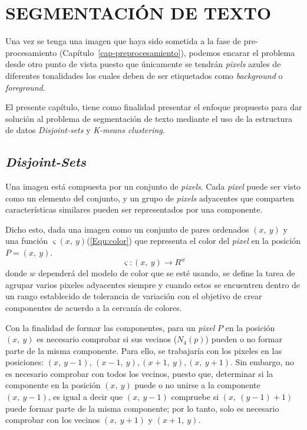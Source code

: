 \chapter{SEGMENTACIÓN DE TEXTO}
\label{cap-segmentacion}

\setcounter{secnumdepth}{0}

Una vez se tenga una imagen que haya sido sometida a la fase de pre-
procesamiento (Capítulo~\ref{cap-preprocesamiento}), podemos encarar el problema
 desde otro punto de vista puesto que únicamente se tendrán \textit{pixels} 
 azules de diferentes tonalidades los cuales deben de ser etiquetados como 
 \textit{background} o \textit{foreground}.

El presente capítulo, tiene como finalidad presentar el enfoque propuesto para 
dar solución al problema de segmentación de texto mediante el uso de la 
estructura de datos \textit{Disjoint-sets} y \textit{K-means clustering}.

\setcounter{secnumdepth}{3}
\section{\textit{Disjoint-Sets}}
Una imagen está compuesta por un conjunto de \textit{pixels}. Cada 
\textit{pixel} puede ser visto como un elemento del conjunto, y un grupo de 
\textit{pixels} adyacentes que comparten características similares pueden ser
 representados por una componente.

Dicho esto, dada una imagen como un conjunto de pares ordenados $(x,~y)$ y una 
función $\varsigma(x,~y)$(\ref{Equ:color}) que representa el color del 
\textit{pixel} en la posición $P=(x,~y)$.
\begin{equation}
	\varsigma:(x,~y) \rightarrow R^w
	\label{Equ:color}
\end{equation}
donde $w$ dependerá del modelo de color que se esté usando, se define la tarea
 de agrupar varios pixeles adyacentes siempre y cuando estos se encuentren 
 dentro de un rango establecido de tolerancia de variación con el objetivo de 
 crear componentes de acuerdo a la cercanía de colores.

Con la finalidad de formar las componentes, para un \textit{pixel} $P$ en la
 posición $(x,~y)$ es necesario comprobar si sus vecinos ($N_4(p)$) pueden o no
  formar parte de la misma componente. Para ello, se trabajaría con los pixeles 
  en las posiciones: $(x,~y - 1)$, $(x - 1,~y), (x + 1,~y), (x,~y + 1)$. Sin 
  embargo, no es necesario comprobar con todos los vecinos, puesto que, 
  determinar si la componente en la posición $(x,~y)$ puede o no unirse a la
   componente $(x,~ y - 1)$, es igual a decir que $(x,~ y - 1)$ compruebe si 
   $(x,~ (y - 1) + 1)$ puede formar parte de la misma componente; por lo tanto,
    solo es necesario comprobar con los vecinos $(x,~ y + 1)$ y $(x + 1,~ y)$.

